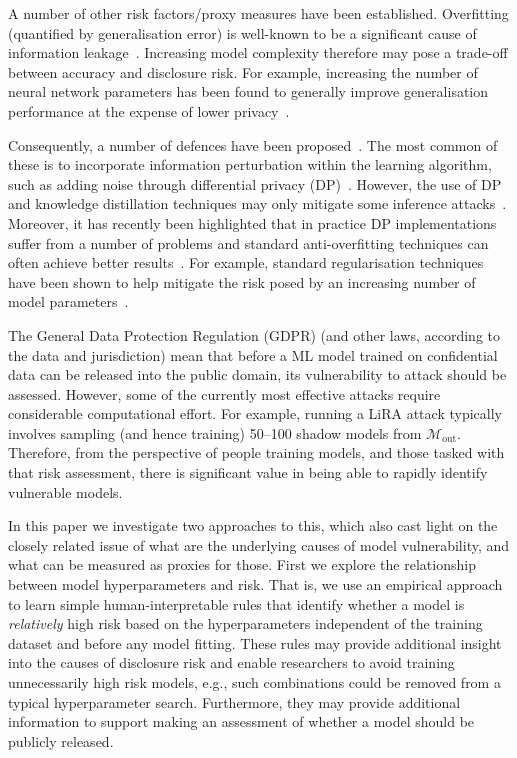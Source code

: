A number of other risk factors/proxy measures have been established. Overfitting (quantified by generalisation error) is well-known to be a significant cause of information leakage~\cite{Yeom:2018, Yeom:2020}. Increasing model complexity therefore may pose a trade-off between accuracy and disclosure risk. For example, increasing the number of neural network parameters has been found to generally improve generalisation performance at the expense of lower privacy~\cite{Tan:2022}.

Consequently, a number of defences have been proposed~\cite{Hu:2023, Jarin:2023}. The most common of these is to incorporate information perturbation within the learning algorithm, such as adding noise through differential privacy (DP)~\cite{Dwork:2008}. However, the use of DP and knowledge distillation techniques may only mitigate some inference attacks~\cite{Liu:2022}. Moreover, it has recently been highlighted that in practice DP implementations suffer from a number of problems and standard anti-overfitting techniques can often achieve better results~\cite{Blanco-Justicia:2022}. For example, standard regularisation techniques have been shown to help mitigate the risk posed by an increasing number of model parameters~\cite{Tan:2023}.

The General Data Protection Regulation (GDPR) (and other laws, according to the data and jurisdiction) mean that before a ML model trained on confidential data can be released into the public domain, its vulnerability to attack should be assessed. However, some of the currently most effective attacks require considerable computational effort. For example, running a LiRA attack typically involves sampling (and hence training) 50--100 shadow models from $\mathcal{M}_{\text{out}}$. Therefore, from the perspective of people training models, and those tasked with that risk assessment, there is significant value in being able to rapidly identify vulnerable models. 

In this paper we investigate two approaches to this, which also cast light on the closely related issue of what are the underlying causes of model vulnerability, and what can be measured as proxies for those. First we explore the relationship between model hyperparameters and risk. That is, we use an empirical approach to learn simple human-interpretable rules that identify whether a model is \textit{relatively} high risk based on the hyperparameters independent of the training dataset and before any model fitting. These rules may provide additional insight into the causes of disclosure risk and enable researchers to avoid training unnecessarily high risk models, e.g., such combinations could be removed from a typical hyperparameter search. Furthermore, they may provide additional information to support making an assessment of whether a model should be publicly released.

